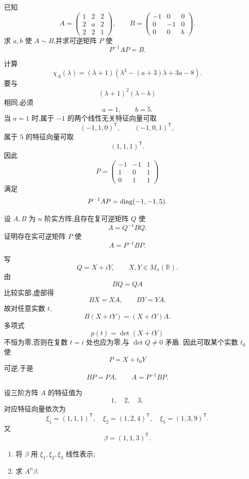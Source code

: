 \begin{example}
已知
\[
A=
\begin{pmatrix}
1&2&2\\
2&a&2\\
2&2&1
\end{pmatrix},
\qquad
B=
\begin{pmatrix}
-1&0&0\\
0&-1&0\\
0&0&b
\end{pmatrix}.
\]
求 $a,b$ 使 $A\sim B$,并求可逆矩阵 $P$ 使
\[
P^{-1}AP=B.
\]
\end{example}
\exampleblank

\begin{solution}
计算
\[
\chi_A(\lambda)
=
(\lambda+1)
\left(
\lambda^2-(a+3)\lambda+3a-8
\right).
\]
要与
\[
(\lambda+1)^2(\lambda-b)
\]
相同,必须
\[
a=1,\qquad b=5.
\]
当 $a=1$ 时,属于 $-1$ 的两个线性无关特征向量可取
\[
(-1,1,0)^{\mathsf T},
\qquad
(-1,0,1)^{\mathsf T},
\]
属于 $5$ 的特征向量可取
\[
(1,1,1)^{\mathsf T}.
\]
因此
\[
\boxed{
P=
\begin{pmatrix}
-1&-1&1\\
1&0&1\\
0&1&1
\end{pmatrix}
}
\]
满足
\[
P^{-1}AP=\operatorname{diag}(-1,-1,5).
\]
\end{solution}


\begin{example}[\markstar]
设 $A,B$ 为 $n$ 阶实方阵,且存在复可逆矩阵 $Q$ 使
\[
A=Q^{-1}BQ.
\]
证明存在实可逆矩阵 $P$ 使
\[
A=P^{-1}BP.
\]
\end{example}
\exampleblank

\begin{solution}
写
\[
Q=X+iY,
\qquad
X,Y\in M_n(\mathbb{R}).
\]
由
\[
BQ=QA
\]
比较实部,虚部得
\[
BX=XA,\qquad BY=YA.
\]
故对任意实数 $t$,
\[
B(X+tY)=(X+tY)A.
\]
多项式
\[
p(t)=\det(X+tY)
\]
不恒为零,否则在复数 $t=i$ 处也应为零,与 $\det Q\neq0$ 矛盾.
因此可取某个实数 $t_0$ 使
\[
P=X+t_0Y
\]
可逆,于是
\[
BP=PA,
\qquad
A=P^{-1}BP.
\]
\end{solution}


\begin{example}
设三阶方阵 $A$ 的特征值为
\[
1,\quad2,\quad3,
\]
对应特征向量依次为
\[
\xi_1=(1,1,1)^{\mathsf T},\quad
\xi_2=(1,2,4)^{\mathsf T},\quad
\xi_3=(1,3,9)^{\mathsf T}.
\]
又
\[
\beta=(1,1,3)^{\mathsf T}.
\]
\begin{enumerate}
    \item 将 $\beta$ 用 $\xi_1,\xi_2,\xi_3$ 线性表示;
    \item 求 $A^n\beta$.
\end{enumerate}
\end{example}
\exampleblank

